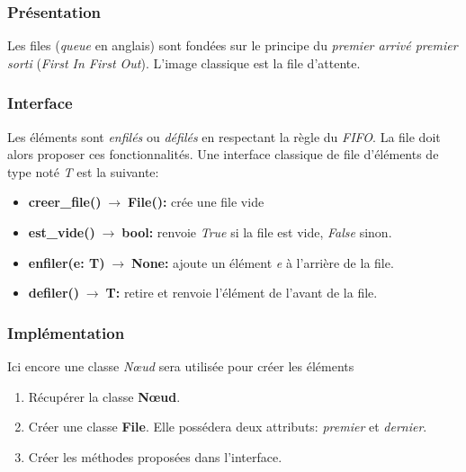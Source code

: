 \documentclass[a4paper,11pt]{article}
\begin{document}
\begin{Form}
\subsubsection{Présentation}
Les files (\emph{queue} en anglais) sont fondées sur le principe du \emph{premier arrivé premier sorti} (\emph{First In First Out}). L'image classique est la file d'attente.
\begin{figure}[!h]
\centering
{}
\end{figure}
\subsubsection{Interface}
Les éléments sont \emph{enfilés} ou \emph{défilés} en respectant la règle du \emph{FIFO}. La file doit alors proposer ces fonctionnalités. Une interface classique de file  d'éléments de type noté \emph{T} est la suivante:
\begin{itemize}
\item \textbf{creer\_file()$\;\rightarrow\;$File():} crée une file vide
\item \textbf{est\_vide()$\;\rightarrow\;$bool:} renvoie \emph{True} si la file est vide, \emph{False} sinon.
\item \textbf{enfiler(e: T)$\;\rightarrow\;$None:} ajoute un élément \emph{e} à l'arrière de la file.
\item \textbf{defiler()$\;\rightarrow\;$T:} retire et renvoie l'élément de l'avant de la file.
\end{itemize}
\subsubsection{Implémentation}
Ici encore une classe \emph{Nœud} sera utilisée pour créer les éléments
\begin{activite}
\begin{enumerate}
\item Récupérer la classe \textbf{Nœud}. 
\item Créer une classe \textbf{File}. Elle possédera deux attributs: \emph{premier} et \emph{dernier}.
\item Créer les méthodes proposées dans l'interface.
\end{enumerate}
\end{activite}

\end{Form}
\end{document}
